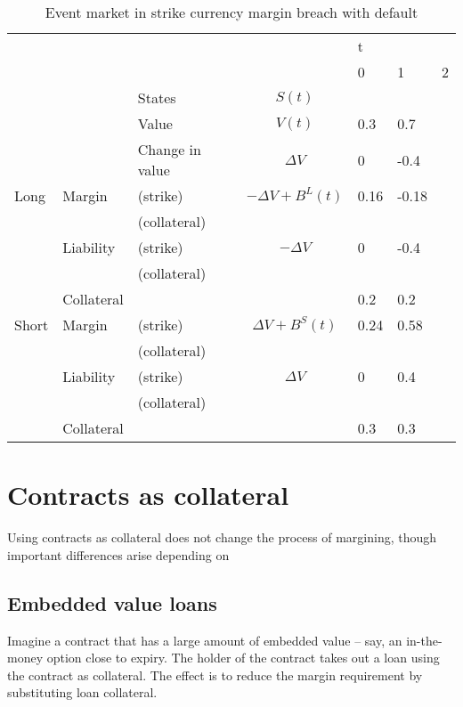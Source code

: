 \documentclass[12pt]{article}
\begin{document}
\begin{table}
\begin{tabular}{lll|c|lll}
&  &  &  & t & &\\  
&  &  &  & 0 & 1 & 2\\
\hline
&  & States &  $S(t)$ &   &   & \\
&  & Value  &  $V(t)$  & 0.3 & 0.7 &  \\
&  & Change in value & $\Delta V$ & 0& -0.4 &  \\
\hline
Long      & Margin    & (strike)     & $-\Delta V + B^L(t)$& 0.16 & -0.18 & \\
          &           & (collateral) & & & &\\ 
          & Liability & (strike)     & $-\Delta V$ & 0 & -0.4 & \\ 
          &           & (collateral)& & & &\\
          & Collateral&                       &    & 0.2 & 0.2 & \\
\hline          
Short     & Margin    & (strike)     & $\Delta V + B^S(t)$ & 0.24 & 0.58 & \\
          &           & (collateral) & & & &\\
          & Liability & (strike)     & $\Delta V$ & 0 & 0.4 &\\
          &           & (collateral) & & & &\\
          & Collateral&                       &    & 0.3 & 0.3 & \\ 
          
\end{tabular}
\caption{Event market in strike currency margin breach with default}
\label{fut}
\end{table}



\section{Contracts as collateral}

Using contracts as collateral does not change the process of margining, though important differences arise depending on 

\subsection{Embedded value loans}

Imagine a contract that has a large amount of embedded value -- say, an in-the-money option close to expiry. The holder of the contract takes out a loan using the contract as collateral. The effect is to reduce the margin requirement by substituting loan collateral. 
\end{document}
